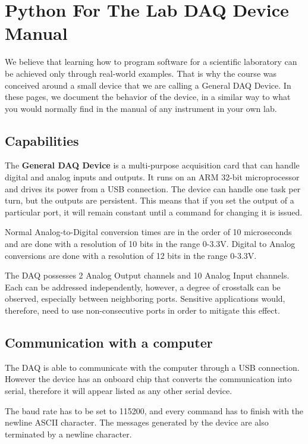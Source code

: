 \chapter{Python For The Lab {DAQ} Device Manual}\label{python-for-the-lab-daq-devicemanual}
We believe that learning how to program software for a scientific
laboratory can be achieved only through real-world examples. That is why
the course was conceived around a small device that we are calling a
General {DAQ} Device. In these pages, we document the behavior of the
device, in a similar way to what you would normally find in the manual
of any instrument in your own lab.

\section{Capabilities}\label{capabilities}
The \textbf{General {DAQ} Device} is a multi-purpose acquisition card
that can handle digital and analog inputs and outputs. It runs on an
{ARM} 32-bit microprocessor and drives its power from a {USB}
connection. The device can handle one task per turn, but the outputs are
persistent. This means that if you set the output of a particular port,
it will remain constant until a command for changing it is issued.

Normal Analog-to-Digital conversion times are in the order of 10
microseconds and are done with a resolution of 10 bits in the range
0-3.3V. Digital to Analog conversions are done with a resolution of 12
bits in the range 0-3.3V.

The {DAQ} possesses 2 Analog Output channels and 10 Analog Input
channels. Each can be addressed independently, however, a degree of
crosstalk can be observed, especially between neighboring ports.
Sensitive applications would, therefore, need to use non-consecutive
ports in order to mitigate this effect.

\section{Communication with a computer}\label{communication-with-acomputer}
The {DAQ} is able to communicate with the computer through a {USB}
connection. However the device has an onboard chip that converts the
communication into serial, therefore it will appear listed as any other
serial device.

The baud rate has to be set to 115200, and every command has to finish
with the newline {ASCII} character. The messages generated by the device
are also terminated by a newline character.

